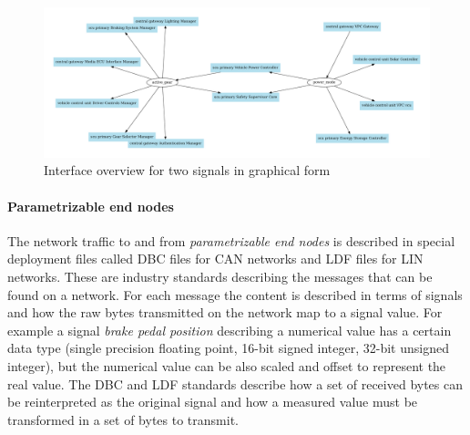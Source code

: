 \begin{figure}[htbp]
    \centering
    \includegraphics[width=\textwidth]{images/interface_overview.pdf}
    \caption{Interface overview for two signals in graphical form}
    \label{fig:interface_overview}
\end{figure}

\paragraph{Parametrizable end nodes}
The network traffic to and from \textit{parametrizable end nodes} is described in special deployment files called DBC files for CAN networks and LDF files for LIN networks. These are industry standards describing the messages that can be found on a network. For each message the content is described in terms of signals and how the raw bytes transmitted on the network map to a signal value. For example a signal \textit{brake pedal position} describing a numerical value has a certain data type (single precision floating point, 16-bit signed integer, 32-bit unsigned integer), but the numerical value can be also scaled and offset to represent the real value. The DBC and LDF standards describe how a set of received bytes can be reinterpreted as the original signal and how a measured value must be transformed in a set of bytes to transmit. 

